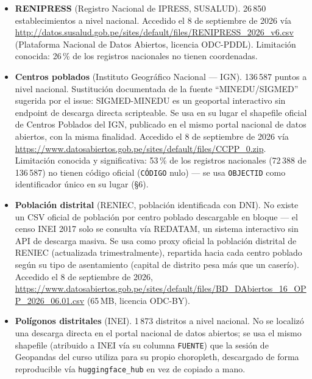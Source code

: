 \documentclass[11pt]{article}
\begin{document}
\begin{itemize}
\item \textbf{RENIPRESS} (Registro Nacional de IPRESS, SUSALUD). 26\,850
  establecimientos a nivel nacional. Accedido el 8 de septiembre de 2026 vía
  \url{http://datos.susalud.gob.pe/sites/default/files/RENIPRESS_2026_v6.csv}
  (Plataforma Nacional de Datos Abiertos, licencia ODC-PDDL). Limitación
  conocida: 26\,\% de los registros nacionales no tienen coordenadas.

\item \textbf{Centros poblados} (Instituto Geográfico Nacional --- IGN).
  136\,587 puntos a nivel nacional. Sustitución documentada de la fuente
  ``MINEDU/SIGMED'' sugerida por el issue: SIGMED-MINEDU es un geoportal
  interactivo sin endpoint de descarga directa scripteable. Se usa en su
  lugar el shapefile oficial de Centros Poblados del IGN, publicado en el
  mismo portal nacional de datos abiertos, con la misma finalidad. Accedido
  el 8 de septiembre de 2026 vía
  \url{https://www.datosabiertos.gob.pe/sites/default/files/CCPP_0.zip}.
  Limitación conocida y significativa: 53\,\% de los registros nacionales
  (72\,388 de 136\,587) no tienen código oficial (\texttt{CÓDIGO} nulo) ---
  se usa \texttt{OBJECTID} como identificador único en su lugar (\S6).

\item \textbf{Población distrital} (RENIEC, población identificada con
  DNI). No existe un CSV oficial de población por centro poblado
  descargable en bloque --- el censo INEI 2017 solo se consulta vía
  REDATAM, un sistema interactivo sin API de descarga masiva. Se usa como
  proxy oficial la población distrital de RENIEC (actualizada
  trimestralmente), repartida hacia cada centro poblado según su tipo de
  asentamiento (capital de distrito pesa más que un caserío). Accedido el 8
  de septiembre de 2026,
  \url{https://www.datosabiertos.gob.pe/sites/default/files/BD_DAbiertos_16_OPP_2026_06.01.csv}
  (65\,MB, licencia ODC-BY).

\item \textbf{Polígonos distritales} (INEI). 1\,873 distritos a nivel
  nacional. No se localizó una descarga directa en el portal nacional de
  datos abiertos; se usa el mismo shapefile (atribuido a INEI vía su columna
  \texttt{FUENTE}) que la sesión de Geopandas del curso utiliza para su
  propio choropleth, descargado de forma reproducible vía
  \texttt{huggingface\_hub} en vez de copiado a mano.


\end{itemize}
\end{document}
